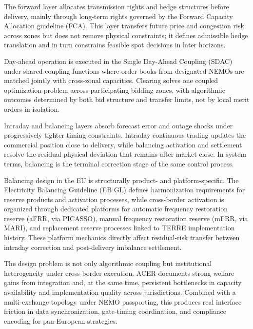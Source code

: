\documentclass[oneside,10pt]{swissi}
\begin{document}
The forward layer allocates transmission rights and hedge structures before delivery, mainly through long-term rights governed by the Forward Capacity Allocation guideline (FCA). This layer transfers future price and congestion risk across zones but does not remove physical constraints; it defines admissible hedge translation and in turn constrains feasible spot decisions in later horizons.\cite{eu_reg_2016_1719,ec_network_codes_2026}

Day-ahead operation is executed in the Single Day-Ahead Coupling (SDAC) under shared coupling functions where order books from designated NEMOs are matched jointly with cross-zonal capacities. Clearing solves one coupled optimization problem across participating bidding zones, with algorithmic outcomes determined by both bid structure and transfer limits, not by local merit orders in isolation.\cite{acer_market_coupling_development_2026,acer_nemo_designation_2026,nord_pool_day_ahead_2026}

Intraday and balancing layers absorb forecast error and outage shocks under progressively tighter timing constraints. Intraday continuous trading updates the commercial position close to delivery, while balancing activation and settlement resolve the residual physical deviation that remains after market close. In system terms, balancing is the terminal correction stage of the same control process.\cite{nord_pool_intraday_2026,ec_network_codes_2026,eu_reg_2019_943}

Balancing design in the EU is structurally product- and platform-specific. The Electricity Balancing Guideline (EB GL) defines harmonization requirements for reserve products and activation processes, while cross-border activation is organized through dedicated platforms for automatic frequency restoration reserve (aFRR, via PICASSO), manual frequency restoration reserve (mFRR, via MARI), and replacement reserve processes linked to TERRE implementation history. These platform mechanics directly affect residual-risk transfer between intraday correction and post-delivery imbalance settlement.\cite{eu_reg_2017_2195_ebgl,entsoe_picasso_2026,entsoe_mari_2026,entsoe_terre_2026}

The design problem is not only algorithmic coupling but institutional heterogeneity under cross-border execution. ACER documents strong welfare gains from integration and, at the same time, persistent bottlenecks in capacity availability and implementation quality across jurisdictions. Combined with a multi-exchange topology under NEMO passporting, this produces real interface friction in data synchronization, gate-timing coordination, and compliance encoding for pan-European strategies.\cite{acer_final_assessment_report_2022,acer_market_design_assessment_2022,acer_nemo_list_jan_2026}
\end{document}
